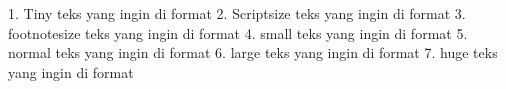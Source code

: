 1. Tiny
{\tiny teks yang ingin di format}
2. Scriptsize
{\scriptsize teks yang ingin di format}
3. footnotesize
{\footnotesize teks yang ingin di format}
4. small
{\small teks yang ingin di format}
5. normal
{\normalsize teks yang ingin di format}
6. large 
{\large teks yang ingin di format}
7. huge
{\huge teks yang ingin di format}
